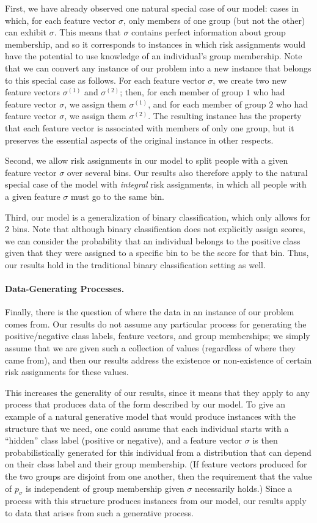 \documentclass[11pt]{article}
\newcommand{\xhdr}[1]{\vspace{-0.2in} \paragraph*{\bf {#1}.}}
\begin{document}
First, we have already observed one natural special case of our model:
cases in which, for each feature vector $\sigma$, only members
of one group (but not the other) can exhibit $\sigma$.
This means that $\sigma$ contains perfect information about group membership,
and so it corresponds to instances in which risk assignments would have
the potential to use knowledge of an individual's group membership.
Note that we can convert any instance of our problem into a new
instance that belongs to this special case as follows.
For each feature vector $\sigma$, we create two new feature
vectors $\sigma^{(1)}$ and $\sigma^{(2)}$; then, for each member of group $1$
who had feature vector $\sigma$, we assign them $\sigma^{(1)}$, and for
each member of group $2$
who had feature vector $\sigma$, we assign them $\sigma^{(2)}$.
The resulting instance has the property that each feature vector is
associated with members of only one group, but it preserves the
essential aspects of the original instance in other respects.

Second, 
we allow risk assignments in our model to split
people with a given feature vector $\sigma$ over several bins.
Our results also therefore apply to the natural special case of the model
with {\em integral} risk assignments,
in which all people with a given feature $\sigma$ must go to the same bin.

Third, our model is a generalization of binary classification, which only allows
for 2 bins. Note that although binary classification does not explicitly assign
scores, we can consider the probability that an individual belongs to the
positive class given that they were assigned to a specific bin to be the score
for that bin. Thus, our results hold in the traditional binary classification
setting as well.

\xhdr{Data-Generating Processes}
Finally, there is the question of where the data in an instance of
our problem comes from.  
Our results do not assume any particular process for generating
the positive/negative class labels, 
feature vectors, and group memberships; we simply assume that
we are given such a collection of values (regardless of where they
came from), and then our results address the existence or non-existence
of certain risk assignments for these values.

This increases the generality of our results, since it means that they 
apply to any process that produces data of the form described by our model.
To give an example of a natural generative model that would produce
instances with the structure that we need, 
one could assume
that each individual starts with a ``hidden'' class label 
(positive or negative), and a feature
vector $\sigma$ is then probabilistically generated for this individual
from a distribution that can depend on their class label 
and their group membership.
(If feature vectors produced for the two groups are disjoint from
one another, then the requirement that the value of $p_\sigma$
is independent of group membership given $\sigma$ necessarily holds.)
Since a process with this structure produces instances
from our model, 
our results apply to data that arises from such a generative process.
\end{document}
